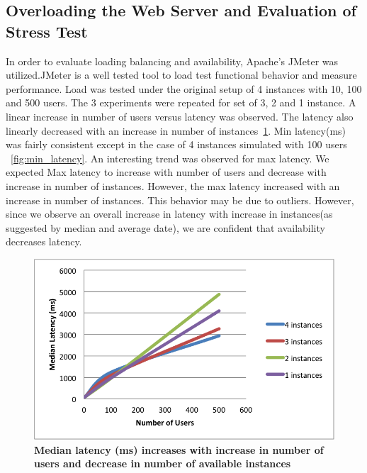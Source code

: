 \documentclass[12pt]{article}
\begin{document}
\subsection{Overloading the Web Server and Evaluation of Stress Test}
In order to evaluate loading balancing and availability, Apache's JMeter was
utilized.JMeter is a well tested tool to load test functional behavior and
measure performance\cite{apache}. Load was tested under the original setup of 4
instances with 10, 100 and 500 users. The 3 experiments were repeated for set of
3, 2 and 1 instance. A linear increase in number of users versus latency was
observed. The latency also linearly decreased with an increase in number of
instances~\ref{fig:median_latency}. Min latency(ms) was fairly consistent except
in the case of 4 instances simulated with 100 users ~\ref{fig:min_latency}. An interesting trend was observed for max latency. We expected Max latency to increase with number of users and decrease with increase in number of instances. However, the max latency increased with an increase in number of instances. This behavior may be due to outliers. However, since we observe an overall increase in latency with increase in instances(as suggested by median and average date), we are confident that availability decreases latency. 
\begin{figure}[H]
  \centering
      \includegraphics[scale=0.75]{Images/median_latency.PNG}
  \caption{\textbf{Median latency (ms) increases with increase in number of users and decrease in number of available instances} }
\label{fig:median_latency}
\end{figure}
\end{document}
